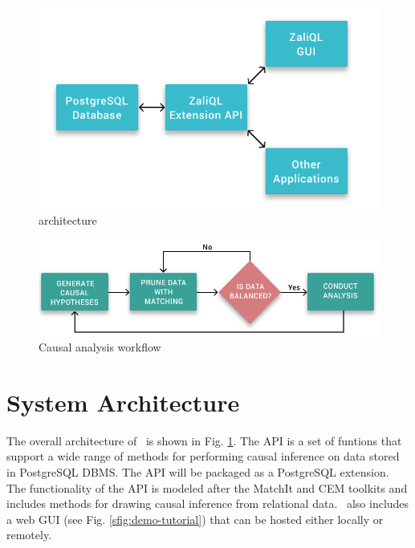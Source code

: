 
\begin{figure}\center
 \includegraphics[scale=0.15]{Figures/System-Overview.png}
  \vspace{-3.3mm} \caption{\GSQLB architecture}

  \label{fig:arch}
  \vspace{-3mm}
\end{figure}


\begin{figure} \center
  \includegraphics[scale=0.18]{Figures/Matching-Flowchart.png}
  \vspace{-3mm}\caption{Causal analysis workflow}

\label{fig:flowchart}
\vspace{-0.3cm}
\end{figure}

\vspace{-.2cm}

\section{System Architecture}

The overall architecture of \GSQL\ is shown in Fig. \ref{fig:arch}.
The API is a set of funtions that support a wide
range of methods for performing causal inference on data stored in PostgreSQL DBMS. %
The API will be packaged as a PostgreSQL extension. %
The functionality of the API is modeled after the MatchIt and CEM toolkits 
\cite{ho2005,iacus2009cem} and includes methods for drawing causal inference from relational data. \GSQL\ also includes a web GUI
(see Fig. \ref{sfig:demo-tutorial}) that can be hosted either locally or
remotely. %


